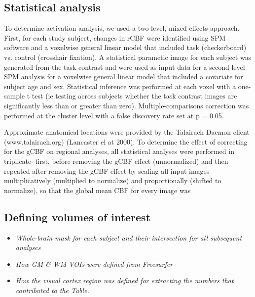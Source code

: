 \subsection{Statistical analysis}
To determine activation analysis, we used a two-level, mixed effects approach.  First, for each study subject, changes in rCBF were identified using SPM software and a voxelwise general linear model that included task (checkerboard) vs. control (crosshair fixation). A statistical parametic image for each subject was generated from the task contrast and were used as input data for a second-level SPM analysis for a voxelwise general linear model that included a covariate for subject age and sex. Statistical inference was performed at each voxel with a one-sample t test (ie testing across subjects whether the task contrast images are significantly less than or greater than zero). 
Multiple-comparisons correction was performed at the cluster level with a false discovery rate set at p = 0.05. 

Approximate anatomical locations were provided by the Talairach Daemon client (www.talairach.org) (Lancaster el at 2000). 
To determine the effect of correcting for the gCBF on regional analyses, all statistical analyses were performed in triplicate- first, before removing the gCBF effect (unnormalized) and then repeated after removing the gCBF effect by scaling all input images multiplicatively (multiplied to normalize) and proportionally (shifted to normalize), so that the global mean CBF for every image was 


\subsection{Defining volumes of interest}
\begin{itemize}
\item \textit{Whole-brain mask for each subject and their intersection for all subsequent analyses}
\item \textit{How GM & WM VOIs were defined from Freesurfer}
\item \textit{How the visual cortex region was defined for extracting the numbers that contributed to the Table.}
\end{itemize}






